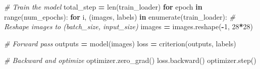 \documentclass[]{book}
\newenvironment{Shaded}{\begin{snugshade}}{\end{snugshade}}
\newcommand{\BuiltInTok}[1]{#1}
\newcommand{\CommentTok}[1]{\textcolor[rgb]{0.56,0.35,0.01}{\textit{#1}}}
\newcommand{\ControlFlowTok}[1]{\textcolor[rgb]{0.13,0.29,0.53}{\textbf{#1}}}
\newcommand{\DecValTok}[1]{\textcolor[rgb]{0.00,0.00,0.81}{#1}}
\newcommand{\KeywordTok}[1]{\textcolor[rgb]{0.13,0.29,0.53}{\textbf{#1}}}
\newcommand{\NormalTok}[1]{#1}
\newcommand{\OperatorTok}[1]{\textcolor[rgb]{0.81,0.36,0.00}{\textbf{#1}}}
\begin{document}
\begin{Shaded}
\begin{Highlighting}[]
\CommentTok{# Train the model}
\NormalTok{total_step }\OperatorTok{=} \BuiltInTok{len}\NormalTok{(train_loader)}
\ControlFlowTok{for}\NormalTok{ epoch }\KeywordTok{in} \BuiltInTok{range}\NormalTok{(num_epochs):}
    \ControlFlowTok{for}\NormalTok{ i, (images, labels) }\KeywordTok{in} \BuiltInTok{enumerate}\NormalTok{(train_loader):}
        \CommentTok{# Reshape images to (batch_size, input_size)}
\NormalTok{        images }\OperatorTok{=}\NormalTok{ images.reshape(}\OperatorTok{-}\DecValTok{1}\NormalTok{, }\DecValTok{28}\OperatorTok{*}\DecValTok{28}\NormalTok{)}
        
        \CommentTok{# Forward pass}
\NormalTok{        outputs }\OperatorTok{=}\NormalTok{ model(images)}
\NormalTok{        loss }\OperatorTok{=}\NormalTok{ criterion(outputs, labels)}
        
        \CommentTok{# Backward and optimize}
\NormalTok{        optimizer.zero_grad()}
\NormalTok{        loss.backward()}
\NormalTok{        optimizer.step()}
        

\end{Highlighting}
\end{Shaded}
\end{document}
